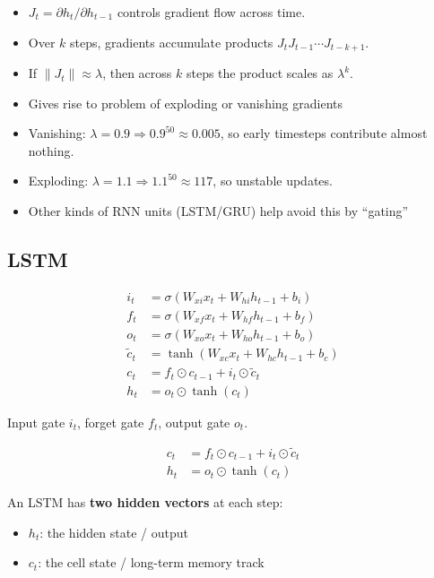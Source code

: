 \documentclass[
]{article}
\providecommand{\tightlist}{%
  \setlength{\itemsep}{0pt}\setlength{\parskip}{0pt}}
\begin{document}
\begin{itemize}
\item
  \(J_t = \partial h_t/\partial h_{t-1}\) controls gradient flow across
  time.\\
\item
  Over \(k\) steps, gradients accumulate products
  \(J_t J_{t-1}\cdots J_{t-k+1}\).
\item
  If \(\|J_t\|\approx \lambda\), then across \(k\) steps the product
  scales as \(\lambda^k\).
\item
  Gives rise to problem of exploding or vanishing gradients
\item
  Vanishing: \(\lambda = 0.9 \Rightarrow 0.9^{50}\approx 0.005\), so
  early timesteps contribute almost nothing.\\
\item
  Exploding: \(\lambda = 1.1 \Rightarrow 1.1^{50}\approx 117\), so
  unstable updates.
\item
  Other kinds of RNN units (LSTM/GRU) help avoid this by ``gating''
\end{itemize}

\subsection{LSTM}\label{lstm}

\[
\begin{aligned}
i_t &= \sigma(W_{xi}x_t + W_{hi}h_{t-1} + b_i) \\
f_t &= \sigma(W_{xf}x_t + W_{hf}h_{t-1} + b_f) \\
o_t &= \sigma(W_{xo}x_t + W_{ho}h_{t-1} + b_o) \\
\tilde{c}_t &= \tanh(W_{xc}x_t + W_{hc}h_{t-1} + b_c) \\
c_t &= f_t \odot c_{t-1} + i_t \odot \tilde{c}_t \\
h_t &= o_t \odot \tanh(c_t)
\end{aligned}
\]

Input gate \(i_t\), forget gate \(f_t\), output gate \(o_t\).

\[
\begin{aligned}
c_t &= f_t \odot c_{t-1} + i_t \odot \tilde{c}_t \\
h_t &= o_t \odot \tanh(c_t)
\end{aligned}
\]

An LSTM has \textbf{two hidden vectors} at each step:

\begin{itemize}
\tightlist
\item
  \(h_t\): the hidden state / output\\
\item
  \(c_t\): the cell state / long-term memory track
\end{itemize}
\end{document}
